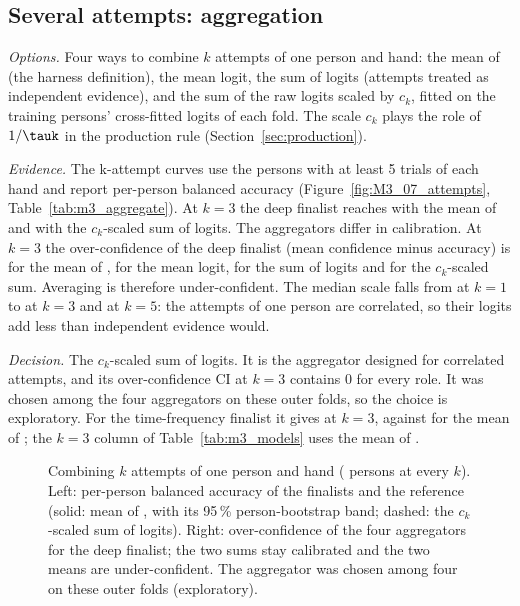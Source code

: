 \subsection{Several attempts: aggregation}\label{app:m3:attempts}

\emph{Options.} Four ways to combine $k$ attempts of one person and hand: the mean of \pright{} (the harness definition), the mean logit, the sum of logits (attempts treated as independent evidence), and the sum of the raw logits scaled by $c_k$, fitted on the training persons' cross-fitted logits of each fold.
The scale $c_k$ plays the role of $1/\tauk$ in the production rule (Section~\ref{sec:production}).

\emph{Evidence.} The k-attempt curves use the  persons with at least 5 trials of each hand and report per-person balanced accuracy (Figure~\ref{fig:M3_07_attempts}, Table~\ref{tab:m3_aggregate}).
At $k = 3$ the deep finalist reaches  with the mean of \pright{} and  with the $c_k$-scaled sum of logits.
The aggregators differ in calibration.
At $k = 3$ the over-confidence of the deep finalist (mean confidence minus accuracy) is  for the mean of \pright{},  for the mean logit,  for the sum of logits and  for the $c_k$-scaled sum.
Averaging \pright{} is therefore under-confident.
The median scale falls from  at $k = 1$ to  at $k = 3$ and  at $k = 5$: the attempts of one person are correlated, so their logits add less than independent evidence would.

\emph{Decision.} The $c_k$-scaled sum of logits. It is the aggregator designed for correlated attempts, and its over-confidence CI at $k = 3$ contains 0 for every role.
It was chosen among the four aggregators on these outer folds, so the choice is exploratory.
For the time-frequency finalist it gives  at $k = 3$, against  for the mean of \pright{}; the $k = 3$ column of Table~\ref{tab:m3_models} uses the mean of \pright{}.

\begin{figure}[tbp]
  \centering
  \caption{Combining $k$ attempts of one person and hand ( persons at every $k$). Left: per-person balanced accuracy of the finalists and the reference (solid: mean of \pright{}, with its 95\,\% person-bootstrap band; dashed: the $c_k$-scaled sum of logits). Right: over-confidence of the four aggregators for the deep finalist; the two sums stay calibrated and the two means are under-confident. The aggregator was chosen among four on these outer folds (exploratory).}
  \label{fig:M3_07_attempts}\label{fig:app:m3-attempts}
\end{figure}

